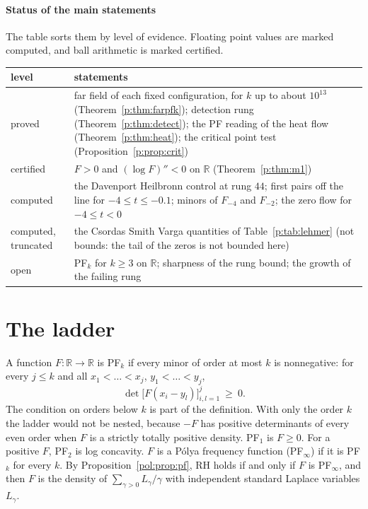 \paragraph{Status of the main statements} The table sorts them by level of evidence. Floating point values are marked computed, and ball arithmetic is marked certified.
\begin{center}
\footnotesize
\begin{tabular}{p{}p{}}
\toprule
level & statements\\
\midrule
proved & far field of each fixed configuration, for $k$ up to about $10^{13}$ (Theorem~\ref{p:thm:farpfk}); detection rung (Theorem~\ref{p:thm:detect}); the PF reading of the heat flow (Theorem~\ref{p:thm:heat}); the critical point test (Proposition~\ref{p:prop:crit})\\
certified & $F>0$ and $(\log F)''<0$ on $\mathbb R$ (Theorem~\ref{p:thm:m1})\\
computed & the Davenport Heilbronn control at rung $44$; first pairs off the line for $-4\le t\le-0.1$; minors of $F_{-4}$ and $F_{-2}$; the zero flow for $-4\le t<0$\\
computed, truncated & the Csordas Smith Varga quantities of Table~\ref{p:tab:lehmer} (not bounds: the tail of the zeros is not bounded here)\\
open & PF$_k$ for $k\ge3$ on $\mathbb R$; sharpness of the rung bound; the growth of the failing rung\\
\bottomrule
\end{tabular}
\end{center}

\section{The ladder}\label{p:sec:target}

A function $F\colon\mathbb R\to\mathbb R$ is PF$_k$ if every minor of order at most $k$ is nonnegative: for every $j\le k$ and all $x_1<\dots<x_j$, $y_1<\dots<y_j$,
\[
\det\big[F(x_i-y_l)\big]_{i,l=1}^j\ \ge\ 0 .
\]
The condition on orders below $k$ is part of the definition. With only the order $k$ the ladder would not be nested, because $-F$ has positive determinants of every even order when $F$ is a strictly totally positive density. PF$_1$ is $F\ge0$. For a positive $F$, PF$_2$ is log concavity. $F$ is a P\'olya frequency function (PF$_\infty$) if it is PF$_k$ for every $k$. By Proposition~\ref{pol:prop:pf}, RH holds if and only if $F$ is PF$_\infty$, and then $F$ is the density of $\sum_{\gamma>0}L_\gamma/\gamma$ with independent standard Laplace variables $L_\gamma$.

